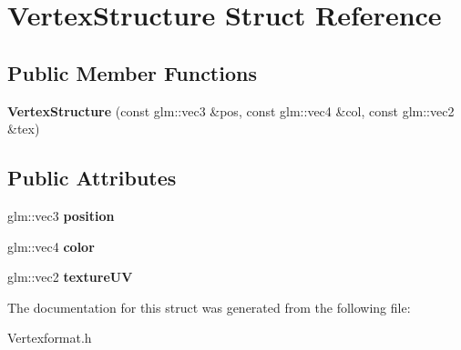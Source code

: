 \hypertarget{structVertexStructure}{
\section{VertexStructure Struct Reference}
\label{structVertexStructure}
}
\subsection*{Public Member Functions}
\begin{DoxyCompactItemize}
\item 
\hypertarget{structVertexStructure_a9c4c269cd69720c0043717b9bbb23696}{
{\bfseries VertexStructure} (const glm::vec3 \&pos, const glm::vec4 \&col, const glm::vec2 \&tex)}
\label{structVertexStructure_a9c4c269cd69720c0043717b9bbb23696}

\end{DoxyCompactItemize}
\subsection*{Public Attributes}
\begin{DoxyCompactItemize}
\item 
\hypertarget{structVertexStructure_a404fdf9024416b6f525f3dafcbac2b02}{
glm::vec3 {\bfseries position}}
\label{structVertexStructure_a404fdf9024416b6f525f3dafcbac2b02}

\item 
\hypertarget{structVertexStructure_a9095e44220ac792f9c9cbc7ebaa6216c}{
glm::vec4 {\bfseries color}}
\label{structVertexStructure_a9095e44220ac792f9c9cbc7ebaa6216c}

\item 
\hypertarget{structVertexStructure_a8437741620daad43e3052c614d1c56f1}{
glm::vec2 {\bfseries textureUV}}
\label{structVertexStructure_a8437741620daad43e3052c614d1c56f1}

\end{DoxyCompactItemize}


The documentation for this struct was generated from the following file:\begin{DoxyCompactItemize}
\item 
Vertexformat.h\end{DoxyCompactItemize}

